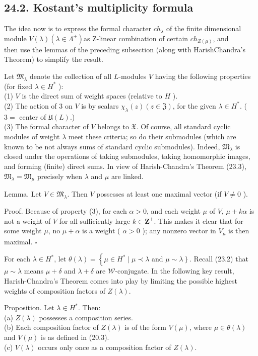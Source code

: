 \documentclass[10pt]{article}
\begin{document}
\subsection*{24.2. Kostant's multiplicity formula}
The idea now is to express the formal character $c h_{\lambda}$ of the finite dimensional module $V(\lambda)\left(\lambda \in \Lambda^{+}\right)$as Z-linear combination of certain $c h_{Z(\mu)}$, and\\
then use the lemmas of the preceding subsection (along with HarishChandra's Theorem) to simplify the result.

Let $\mathfrak{M}_{\lambda}$ denote the collection of all $L$-modules $V$ having the following properties (for fixed $\lambda \in H^{*}$ ):\\
(1) $V$ is the direct sum of weight spaces (relative to $H$ ).\\
(2) The action of 3 on $V$ is by scalars $\chi_{\lambda}(z)(z \in \mathfrak{Z})$, for the given $\lambda \in H^{*}$. ( $3=$ center of $\mathfrak{U}(L)$.)\\
(3) The formal character of $V$ belongs to $\mathfrak{X}$. Of course, all standard cyclic modules of weight $\lambda$ meet these criteria; so do their submodules (which are known to be not always sums of standard cyclic submodules). Indeed, $\mathfrak{M}_{\lambda}$ is closed under the operations of taking submodules, taking homomorphic images, and forming (finite) direct sums. In view of Harish-Chandra's Theorem (23.3), $\mathfrak{M}_{\lambda}=\mathfrak{M}_{\mu}$ precisely when $\lambda$ and $\mu$ are linked.

Lemma. Let $V \in \mathfrak{M}_{\lambda}$. Then $V$ possesses at least one maximal vector (if $V \neq 0$ ).

Proof. Because of property (3), for each $\alpha>0$, and each weight $\mu$ of $V$, $\mu+k \alpha$ is not a weight of $V$ for all sufficiently large $k \in \mathbf{Z}^{+}$. This makes it clear that for some weight $\mu$, no $\mu+\alpha$ is a weight ( $\alpha>0$ ); any nonzero vector in $V_{\mu}$ is then maximal. $\square$

For each $\lambda \in H^{*}$, let $\theta(\lambda)=\left\{\mu \in H^{*} \mid \mu \prec \lambda\right.$ and $\left.\mu \sim \lambda\right\}$. Recall (23.2) that $\mu \sim \lambda$ means $\mu+\delta$ and $\lambda+\delta$ are $\mathscr{W}$-conjugate. In the following key result, Harish-Chandra's Theorem comes into play by limiting the possible highest weights of composition factors of $Z(\lambda)$.

Proposition. Let $\lambda \in H^{*}$. Then:\\
(a) $Z(\lambda)$ possesses a composition series.\\
(b) Each composition factor of $Z(\lambda)$ is of the form $V(\mu)$, where $\mu \in \theta(\lambda)$ and $V(\mu)$ is as defined in (20.3).\\
(c) $V(\lambda)$ occurs only once as a composition factor of $Z(\lambda)$.
\end{document}
